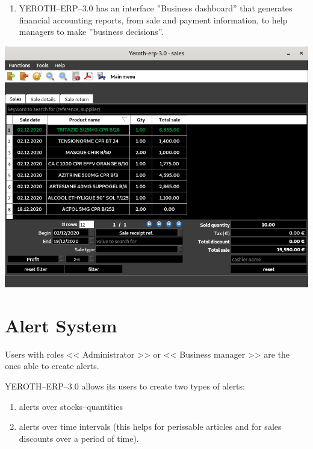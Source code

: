 \documentclass[a4paper, 10pt]{article}
\newcommand{\yerotherpblack}{YEROTH--ERP--$3.0$\xspace}
\newcommand{\administrator}{<< Administrator >>\xspace}
\newcommand{\manager}{<< Business manager >>\xspace}
\begin{document}
\begin{multicols}{2}
\begin{enumerate}
	\item \yerotherpblack has an interface ''Business dashboard'' that
		  generates financial accounting reports,
		  from sale and payment information, to help
		  managers to make ''business decisions''.
\end{enumerate}

\vspace{1em}

\begin{center}
\includegraphics[scale=0.32]{images/yeroth-erp-3-0-sale-information.png}
\label{fig:fenetre-de-la-vente}
\end{center}

\vspace{0.1em}

\section{Alert System}
\vspace{-0.3em}
Users with roles \administrator or \manager
are the ones able to create alerts.

\yerotherpblack allows its users to create two
types of alerts:
\begin{enumerate}
  \itemsep -0.5em
  \item alerts over stocks--quantities
  \item alerts over time intervals (this helps for
	  perissable articles and for sales discounts
	  over a period of time).
\end{enumerate}


\end{multicols}
\end{document}
